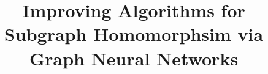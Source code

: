 \documentclass[sigconf,anonymous,review]{article}
\begin{document}
	

	\title{Improving Algorithms
		for Subgraph Homomorphsim via Graph Neural Networks}
		
		\maketitle
	
	
	
	

	
	
	
	
	
\end{document}

